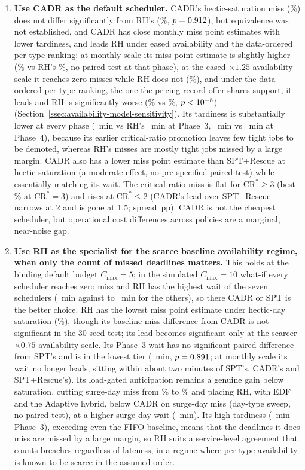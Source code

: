 {\begin{enumerate}
  \item \textbf{Use CADR as the default scheduler.} CADR's hectic-saturation miss (\CADRmiss\%) does not differ significantly from RH's (\RHMiss\%, $p=0.912$), but equivalence was not established, and CADR has close monthly miss point estimates with lower tardiness, and leads RH under eased availability and the data-ordered per-type ranking: at monthly scale its miss point estimate is slightly higher (\PhFourCADRMiss\% vs RH's \PhFourRHMiss\%, no paired test at that phase), at the eased $\times 1.25$ availability scale it reaches zero misses while RH does not (\BetaUpRHmiss\%), and under the data-ordered per-type ranking, the one the pricing-record offer shares support, it leads and RH is significantly worse (\RevCADRmiss\% vs \RevRHmiss\%, $p<10^{-8}$) (Section~\ref{ssec:availability-model-sensitivity}). Its tardiness is substantially lower at every phase (\CADRtard~min vs RH's \RHtard~min at Phase~3, \PhFourCADRTard~min vs \PhFourRHtard~min at Phase~4), because its earlier critical-ratio promotion leaves few tight jobs to be demoted, whereas RH's misses are mostly tight jobs missed by a large margin. CADR also has a lower miss point estimate than SPT+Rescue at hectic saturation (a moderate effect, no pre-specified paired test) while essentially matching its wait. The critical-ratio miss is flat for $\mathrm{CR}^*\geq 3$ (best \CRStarBestMiss\% at $\mathrm{CR}^*=3$) and rises at $\mathrm{CR}^*\leq 2$ (CADR's lead over SPT+Rescue narrows at 2 and is gone at 1.5; spread \CRStarMissSpread\,pp). CADR is not the cheapest scheduler, but operational cost differences across policies are a marginal, near-noise gap.
  \item \textbf{Use RH as the specialist for the scarce baseline availability regime, when only the count of missed deadlines matters.} This holds at the binding default budget $C_{\max}=5$; in the simulated $C_{\max}=10$ what-if every scheduler reaches zero miss and RH has the highest wait of the seven schedulers (\CmaxTenRHwait~min against \CmaxTenOtherWaitLo{} to \CmaxTenOtherWaitHi~min for the others), so there CADR or SPT is the better choice. RH has the lowest miss point estimate under hectic-day saturation (\RHMiss\%), though its baseline miss difference from CADR is not significant in the 30-seed test; its lead becomes significant only at the scarcer $\times 0.75$ availability scale. Its Phase~3 wait has no significant paired difference from SPT's and is in the lowest tier (\RHWait~min, $p=0.891$; at monthly scale its wait no longer leads, sitting within about two minutes of SPT's, CADR's and SPT+Rescue's). Its load-gated anticipation remains a genuine gain below saturation, cutting surge-day miss from \ResSurgeOffMiss\% to \ResSurgeOnMiss\% and placing RH, with EDF and the Adaptive hybrid, below CADR on surge-day miss (day-type sweep, no paired test), at a higher surge-day wait (\SensSrgRHwait~min). Its high tardiness (\RHtard~min Phase~3), exceeding even the FIFO baseline, means that the deadlines it does miss are missed by a large margin, so RH suits a service-level agreement that counts breaches regardless of lateness, in a regime where per-type availability is known to be scarce in the assumed order.

\end{enumerate}}
